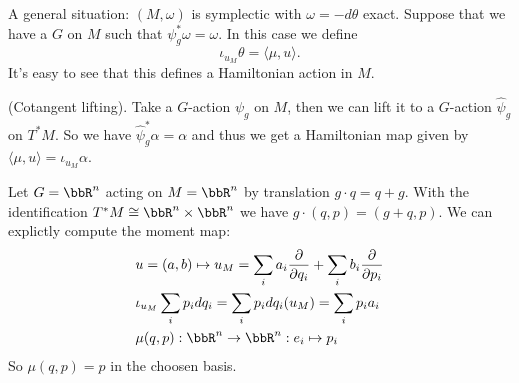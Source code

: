 \begin{example}
    A general situation: $(M,\omega)$ is symplectic with $\omega = -d\theta$ exact. Suppose that we have 
    a $G$ on $M$ such that $\psi_g^*\omega = \omega$. In this case we define 
    \begin{equation}
        \iota_{u_M}\theta =  \langle \mu,u\rangle.
    \end{equation}
    It's easy to see that this defines a Hamiltonian action in $M$.
\end{example}

\begin{example}
    (Cotangent lifting). Take a $G$-action $\psi_g$ on $M$, then we can lift 
    it to a $G$-action $\widehat{\psi}_g$ on $T^*M$. So we have $\widehat{\psi}_g^*\alpha=\alpha$ and thus we get 
    a Hamiltonian map given by $\langle\mu,u\rangle = \iota_{u_M}\alpha$. 
\end{example}

\begin{example}
    Let $G=\bbR^n$ acting on $M=\bbR^n$ by translation $g\cdot q = q+g$. With the identification 
    $T^*M\cong\bbR^n\times\bbR^n$ we have $g\cdot(q,p)=(g+q,p)$. We can explictly compute the moment map:
    \begin{equation}
        \begin{aligned}
            &u = (a,b) \mapsto u_M = \sum_ia_i\frac{\partial}{\partial q_i}+\sum_ib_i\frac{\partial}{\partial p_i}\\
            &\iota_{u_M}\sum_ip_idq_i=\sum_ip_idq_i(u_M)=\sum_ip_ia_i\\
            &\mu(q,p):\bbR^n\to\bbR^n:e_i\mapsto p_i 
        \end{aligned}
    \end{equation}
    So $\mu(q,p)=p$ in the choosen basis.
\end{example}

